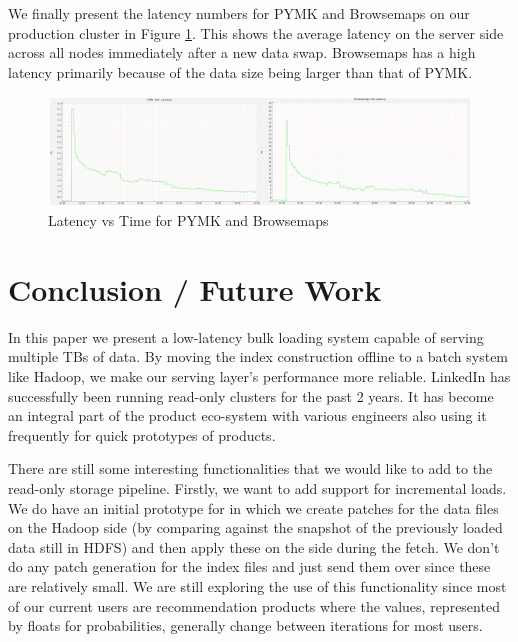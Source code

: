\documentclass[10pt,twocolumn,preprint,nonatbib,numbers]{sigplanconf}
\begin{document}
We finally present the latency numbers for PYMK and Browsemaps on our production cluster in Figure \ref{production}. This shows the average latency on the server side across all nodes immediately after a new data swap. Browsemaps has a high latency primarily because of the data size being larger than that of PYMK.

\begin{figure}
  \centering
    \includegraphics[scale=0.23]{images/get_latency.png}
  \caption{Latency vs Time for PYMK and Browsemaps}
  \label{production}
\end{figure}





\section{Conclusion / Future Work}
\label{sec:conclusion}

In this paper we present a low-latency bulk loading system capable of serving multiple TBs of data. By moving the index construction offline to a batch system like Hadoop, we make our serving layer's performance more reliable. LinkedIn has successfully been running read-only \projectname{} clusters for the past 2 years. It has become an integral part of the product eco-system with various engineers also using it frequently for quick prototypes of products. 

There are still some interesting functionalities that we would like to add to the read-only storage pipeline. Firstly, we want to add support for incremental loads. We do have an initial prototype for in which we create patches for the data files on the Hadoop side (by comparing against the snapshot of the previously loaded data still in HDFS) and then apply these on the \projectname{} side during the fetch. We don't do any patch generation for the index files and just send them over since these are relatively small. We are still exploring the use of this functionality since most of our current users are recommendation products where the values, represented by floats for probabilities, generally change between iterations for most users. 
\end{document}
